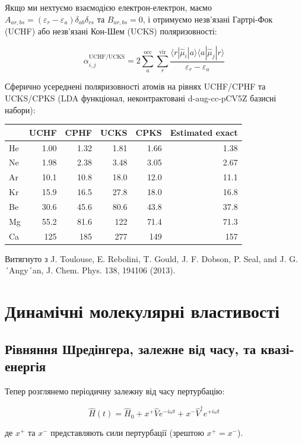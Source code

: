 \documentclass{PySCFBook}
\begin{document}
Якщо ми нехтуємо взаємодією електрон-електрон, маємо \(A_{ar,bs} = (\varepsilon_r - \varepsilon_a) \delta_{ab} \delta_{rs}\) та \(B_{ar,bs} = 0\), і отримуємо незв'язані Гартрі-Фок (UCHF) або незв'язані Кон-Шем (UCKS) поляризовності:

\[\alpha_{i,j}^{\text{UCHF/UCKS}} = 2 \sum_a^{\text{occ}} \sum_r^{\text{vir}} \frac{\langle r | \hat{\mu}_i | a \rangle \langle a | \hat{\mu}_j | r \rangle}{\varepsilon_r - \varepsilon_a}\]

Сферично усереднені поляризовності атомів на рівнях UCHF/CPHF та UCKS/CPKS (LDA функціонал, неконтрактовані d-aug-cc-pCV5Z базисні набори):

\begin{table}[h]
\centering
\begin{tabular}{lrrrrr}
\toprule
 & UCHF & CPHF & UCKS & CPKS & Estimated exact \\
\midrule
He & 1.00 & 1.32 & 1.81 & 1.66 & 1.38 \\
Ne & 1.98 & 2.38 & 3.48 & 3.05 & 2.67 \\
Ar & 10.1 & 10.8 & 18.0 & 12.0 & 11.1 \\
Kr & 15.9 & 16.5 & 27.8 & 18.0 & 16.8 \\
Be & 30.6 & 45.6 & 80.6 & 43.8 & 37.8 \\
Mg & 55.2 & 81.6 & 122 & 71.4 & 71.3 \\
Ca & 125 & 185 & 277 & 149 & 157 \\
\bottomrule
\end{tabular}
\end{table}

Витягнуто з J. Toulouse, E. Rebolini, T. Gould, J. F. Dobson, P. Seal, and J. G. ´Angy´an, J. Chem. Phys. 138, 194106 (2013).

\section{Динамічні молекулярні властивості}

\subsection{Рівняння Шредінгера, залежне від часу, та квазі-енергія}

Тепер розглянемо періодичну залежну від часу пертурбацію:

\[\hat{H}(t) = \hat{H}_0 + x^+ \hat{V} e^{-i \omega t} + x^- \hat{V}^\dagger e^{+i \omega t}\]

де \(x^+\) та \(x^-\) представляють сили пертурбації (зрештою \(x^+ = x^-\)).
\end{document}
